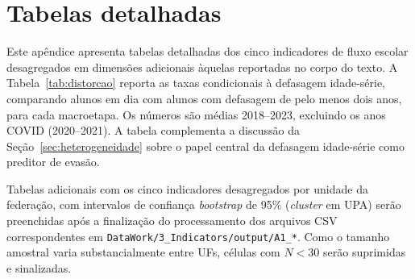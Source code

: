 
\section{Tabelas detalhadas}
\label{app:uf}

Este apêndice apresenta tabelas detalhadas dos cinco indicadores de
fluxo escolar desagregados em dimensões adicionais àquelas
reportadas no corpo do texto. A
Tabela~\ref{tab:distorcao} reporta as taxas condicionais à
defasagem idade-série, comparando alunos em dia com alunos com
defasagem de pelo menos dois anos, para cada macroetapa. Os
números são médias 2018--2023, excluindo os anos COVID
(2020--2021). A tabela complementa a discussão da
Seção~\ref{sec:heterogeneidade} sobre o papel central da
defasagem idade-série como preditor de evasão.



Tabelas adicionais com os cinco indicadores desagregados por
unidade da federação, com intervalos de confiança \emph{bootstrap}
de 95\% (\emph{cluster} em UPA) serão preenchidas após a
finalização do processamento dos arquivos CSV correspondentes em
\texttt{DataWork/3\_Indicators/output/A1\_*}. Como o tamanho
amostral varia substancialmente entre UFs, células com $N < 30$
serão suprimidas e sinalizadas.
